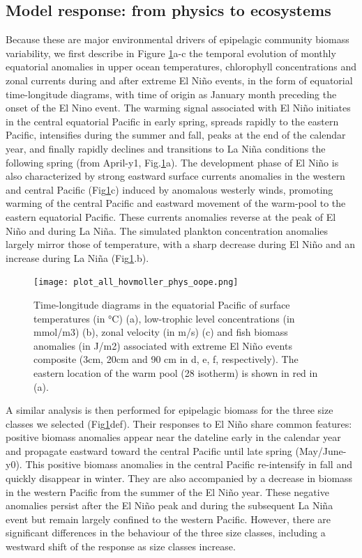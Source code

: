 \subsection{Model response: from physics to ecosystems}

Because these are major environmental drivers of epipelagic community biomass variability, we first describe in Figure \ref{fig:hov_nemo_ape}a-c the temporal evolution of monthly equatorial anomalies in upper ocean temperatures, chlorophyll concentrations and zonal currents during and after extreme El Niño events, in the form of equatorial time-longitude diagrams, with time of origin as January month preceding the onset of the El Nino event. The warming signal associated with El Niño initiates in the central equatorial Pacific in early spring, spreads rapidly to the eastern Pacific, intensifies during the summer and fall, peaks at the end of the calendar year, and finally rapidly declines and transitions to La Niña conditions the following spring (from April-y1, Fig.\ref{fig:hov_nemo_ape}a). The development phase of El Niño is also characterized by strong  eastward surface currents anomalies in the western and central Pacific (Fig\ref{fig:hov_nemo_ape}c) induced by anomalous westerly winds, promoting warming of the central Pacific and eastward movement of the warm-pool to the eastern equatorial Pacific. These currents anomalies reverse at the peak of El Niño and during La Niña. The simulated plankton concentration anomalies largely mirror those of temperature, with a sharp decrease during El Niño and an increase during La Niña (Fig\ref{fig:hov_nemo_ape}.b). 

\begin{figure}[h!tp]
	\centering
	\texttt{[image: plot\_all\_hovmoller\_phys\_oope.png]}	
	\caption{Time-longitude diagrams in the equatorial Pacific of surface temperatures (in °C) (a), low-trophic level concentrations (in mmol/m3) (b), zonal velocity (in m/s) (c) and fish biomass anomalies (in J/m2) associated with extreme El Niño events composite (3cm, 20cm and 90 cm in d, e, f, respectively). The eastern location of the warm pool (28\degree{} isotherm) is shown in red in (a).}	
	\label{fig:hov_nemo_ape}
\end{figure}

A similar analysis is then performed for epipelagic biomass for the three size classes we selected (Fig\ref{fig:hov_nemo_ape}def). Their responses to El Niño share common features: positive biomass anomalies appear near the dateline early in the calendar year and propagate eastward toward the central Pacific until late spring (May/June-y0). This positive biomass anomalies in the central Pacific re-intensify in fall and quickly disappear in winter. They are also accompanied by a decrease in biomass in the western Pacific from the summer of the El Niño year. These negative anomalies persist after the El Niño peak and during the subsequent La Niña event but remain largely confined to the western Pacific. However, there are significant differences in the behaviour of the three size classes, including a westward shift of the response as size classes increase.

